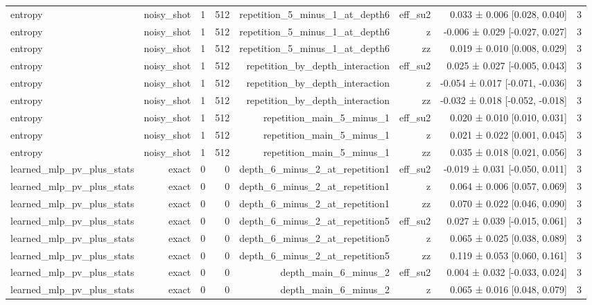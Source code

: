 \begin{table}
\begin{tabular}{lrrrrrrr}
entropy & noisy\_shot & 1 & 512 & repetition\_5\_minus\_1\_at\_depth6 & eff\_su2 & 0.033 ± 0.006 [0.028, 0.040] & 3 \\
entropy & noisy\_shot & 1 & 512 & repetition\_5\_minus\_1\_at\_depth6 & z & -0.006 ± 0.029 [-0.027, 0.027] & 3 \\
entropy & noisy\_shot & 1 & 512 & repetition\_5\_minus\_1\_at\_depth6 & zz & 0.019 ± 0.010 [0.008, 0.029] & 3 \\
entropy & noisy\_shot & 1 & 512 & repetition\_by\_depth\_interaction & eff\_su2 & 0.025 ± 0.027 [-0.005, 0.043] & 3 \\
entropy & noisy\_shot & 1 & 512 & repetition\_by\_depth\_interaction & z & -0.054 ± 0.017 [-0.071, -0.036] & 3 \\
entropy & noisy\_shot & 1 & 512 & repetition\_by\_depth\_interaction & zz & -0.032 ± 0.018 [-0.052, -0.018] & 3 \\
entropy & noisy\_shot & 1 & 512 & repetition\_main\_5\_minus\_1 & eff\_su2 & 0.020 ± 0.010 [0.010, 0.031] & 3 \\
entropy & noisy\_shot & 1 & 512 & repetition\_main\_5\_minus\_1 & z & 0.021 ± 0.022 [0.001, 0.045] & 3 \\
entropy & noisy\_shot & 1 & 512 & repetition\_main\_5\_minus\_1 & zz & 0.035 ± 0.018 [0.021, 0.056] & 3 \\
learned\_mlp\_pv\_plus\_stats & exact & 0 & 0 & depth\_6\_minus\_2\_at\_repetition1 & eff\_su2 & -0.019 ± 0.031 [-0.050, 0.011] & 3 \\
learned\_mlp\_pv\_plus\_stats & exact & 0 & 0 & depth\_6\_minus\_2\_at\_repetition1 & z & 0.064 ± 0.006 [0.057, 0.069] & 3 \\
learned\_mlp\_pv\_plus\_stats & exact & 0 & 0 & depth\_6\_minus\_2\_at\_repetition1 & zz & 0.070 ± 0.022 [0.046, 0.090] & 3 \\
learned\_mlp\_pv\_plus\_stats & exact & 0 & 0 & depth\_6\_minus\_2\_at\_repetition5 & eff\_su2 & 0.027 ± 0.039 [-0.015, 0.061] & 3 \\
learned\_mlp\_pv\_plus\_stats & exact & 0 & 0 & depth\_6\_minus\_2\_at\_repetition5 & z & 0.065 ± 0.025 [0.038, 0.089] & 3 \\
learned\_mlp\_pv\_plus\_stats & exact & 0 & 0 & depth\_6\_minus\_2\_at\_repetition5 & zz & 0.119 ± 0.053 [0.060, 0.161] & 3 \\
learned\_mlp\_pv\_plus\_stats & exact & 0 & 0 & depth\_main\_6\_minus\_2 & eff\_su2 & 0.004 ± 0.032 [-0.033, 0.024] & 3 \\
learned\_mlp\_pv\_plus\_stats & exact & 0 & 0 & depth\_main\_6\_minus\_2 & z & 0.065 ± 0.016 [0.048, 0.079] & 3 \\

\end{tabular}
\end{table}
